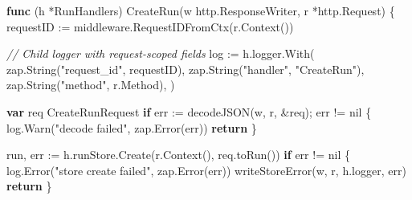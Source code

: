 \documentclass[
]{article}
\newenvironment{Shaded}{}{}
\newcommand{\CommentTok}[1]{\textcolor[rgb]{0.38,0.63,0.69}{\textit{#1}}}
\newcommand{\ControlFlowTok}[1]{\textcolor[rgb]{0.00,0.44,0.13}{\textbf{#1}}}
\newcommand{\KeywordTok}[1]{\textcolor[rgb]{0.00,0.44,0.13}{\textbf{#1}}}
\newcommand{\NormalTok}[1]{#1}
\newcommand{\OperatorTok}[1]{\textcolor[rgb]{0.40,0.40,0.40}{#1}}
\newcommand{\OtherTok}[1]{\textcolor[rgb]{0.00,0.44,0.13}{#1}}
\newcommand{\StringTok}[1]{\textcolor[rgb]{0.25,0.44,0.63}{#1}}
\begin{document}
\begin{Shaded}
\begin{Highlighting}[]
\KeywordTok{func} \OperatorTok{(}\NormalTok{h }\OperatorTok{*}\NormalTok{RunHandlers}\OperatorTok{)}\NormalTok{ CreateRun}\OperatorTok{(}\NormalTok{w http}\OperatorTok{.}\NormalTok{ResponseWriter}\OperatorTok{,}\NormalTok{ r }\OperatorTok{*}\NormalTok{http}\OperatorTok{.}\NormalTok{Request}\OperatorTok{)} \OperatorTok{\{}
\NormalTok{    requestID }\OperatorTok{:=}\NormalTok{ middleware}\OperatorTok{.}\NormalTok{RequestIDFromCtx}\OperatorTok{(}\NormalTok{r}\OperatorTok{.}\NormalTok{Context}\OperatorTok{())}

    \CommentTok{// Child logger with request{-}scoped fields}
\NormalTok{    log }\OperatorTok{:=}\NormalTok{ h}\OperatorTok{.}\NormalTok{logger}\OperatorTok{.}\NormalTok{With}\OperatorTok{(}
\NormalTok{        zap}\OperatorTok{.}\NormalTok{String}\OperatorTok{(}\StringTok{"request\_id"}\OperatorTok{,}\NormalTok{ requestID}\OperatorTok{),}
\NormalTok{        zap}\OperatorTok{.}\NormalTok{String}\OperatorTok{(}\StringTok{"handler"}\OperatorTok{,} \StringTok{"CreateRun"}\OperatorTok{),}
\NormalTok{        zap}\OperatorTok{.}\NormalTok{String}\OperatorTok{(}\StringTok{"method"}\OperatorTok{,}\NormalTok{ r}\OperatorTok{.}\NormalTok{Method}\OperatorTok{),}
    \OperatorTok{)}

    \KeywordTok{var}\NormalTok{ req CreateRunRequest}
    \ControlFlowTok{if}\NormalTok{ err }\OperatorTok{:=}\NormalTok{ decodeJSON}\OperatorTok{(}\NormalTok{w}\OperatorTok{,}\NormalTok{ r}\OperatorTok{,} \OperatorTok{\&}\NormalTok{req}\OperatorTok{);}\NormalTok{ err }\OperatorTok{!=} \OtherTok{nil} \OperatorTok{\{}
\NormalTok{        log}\OperatorTok{.}\NormalTok{Warn}\OperatorTok{(}\StringTok{"decode failed"}\OperatorTok{,}\NormalTok{ zap}\OperatorTok{.}\NormalTok{Error}\OperatorTok{(}\NormalTok{err}\OperatorTok{))}
        \ControlFlowTok{return}
    \OperatorTok{\}}

\NormalTok{    run}\OperatorTok{,}\NormalTok{ err }\OperatorTok{:=}\NormalTok{ h}\OperatorTok{.}\NormalTok{runStore}\OperatorTok{.}\NormalTok{Create}\OperatorTok{(}\NormalTok{r}\OperatorTok{.}\NormalTok{Context}\OperatorTok{(),}\NormalTok{ req}\OperatorTok{.}\NormalTok{toRun}\OperatorTok{())}
    \ControlFlowTok{if}\NormalTok{ err }\OperatorTok{!=} \OtherTok{nil} \OperatorTok{\{}
\NormalTok{        log}\OperatorTok{.}\NormalTok{Error}\OperatorTok{(}\StringTok{"store create failed"}\OperatorTok{,}\NormalTok{ zap}\OperatorTok{.}\NormalTok{Error}\OperatorTok{(}\NormalTok{err}\OperatorTok{))}
\NormalTok{        writeStoreError}\OperatorTok{(}\NormalTok{w}\OperatorTok{,}\NormalTok{ r}\OperatorTok{,}\NormalTok{ h}\OperatorTok{.}\NormalTok{logger}\OperatorTok{,}\NormalTok{ err}\OperatorTok{)}
        \ControlFlowTok{return}
    \OperatorTok{\}}


\end{Highlighting}
\end{Shaded}
\end{document}

